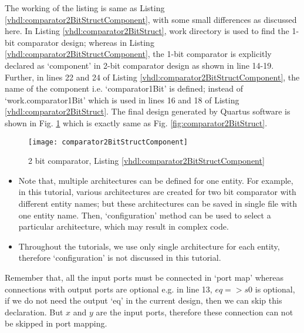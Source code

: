 \begin{explanation}
	The working of the listing is same as Listing \ref{vhdl:comparator2BitStructComponent}, with some small differences as discussed here. 	In Listing \ref{vhdl:comparator2BitStruct}, work directory is used to find the 1-bit comparator design; whereas in Listing \ref{vhdl:comparator2BitStructComponent}, the 1-bit comparator is explicitly declared as `component' in 2-bit comparator design as shown in line 14-19. Further, in lines 22 and 24 of  Listing \ref{vhdl:comparator2BitStructComponent}, the name of the component i.e. `comparator1Bit' is defined; instead of `work.comparator1Bit' which is used in lines 16 and 18 of Listing \ref{vhdl:comparator2BitStruct}. The final design generated by Quartus software is shown in Fig. \ref{fig:comparator2BitStructComponent} which is exactly same as  Fig. \ref{fig:comparator2BitStruct}.
\end{explanation}


\begin{figure}
	\centering
	\texttt{[image: comparator2BitStructComponent]}
	\caption{2 bit comparator, Listing \ref{vhdl:comparator2BitStructComponent}}
	\label{fig:comparator2BitStructComponent}
\end{figure}

\begin{itemize}
	\item Note that, multiple architectures can be defined for one entity. For example, in this tutorial, various architectures are created for two bit comparator with different entity names; but these architectures can be saved in single file with one entity name. Then, `configuration' method can be used to select a particular architecture, which may result in complex code.   
	
	\item Throughout the tutorials, we use only single architecture for each entity, therefore `configuration' is not discussed in this tutorial. 
\end{itemize}

\begin{noNumBox}
	Remember that, all the input ports must be connected in `port map' whereas connections with output ports are optional e.g. in line 13, $eq=>s0$ is optional, if we do not need the output `eq' in the current design, then we can skip this declaration. But $x$ and $y$ are the input ports, therefore these connection can not be skipped in port mapping.	 
\end{noNumBox}
